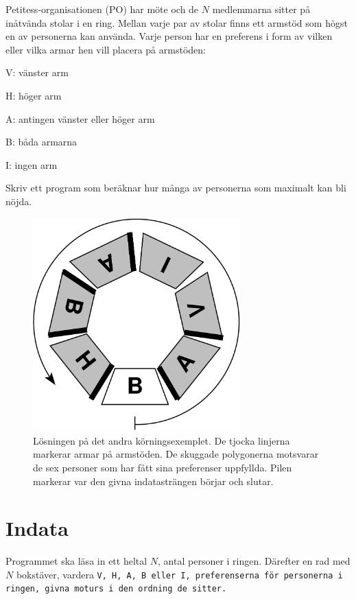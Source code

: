 
Petitess-organisationen (PO) har möte och de $N$ medlemmarna sitter på inåtvända stolar i en ring. Mellan varje par av stolar finns ett armstöd som högst en av personerna kan använda. Varje person har en preferens i form av vilken eller vilka armar hen vill placera på armstöden:
\begin{list}
\item V: vänster arm
\item H: höger arm
\item A: antingen vänster eller höger arm
\item B: båda armarna
\item I: ingen arm
\end{list}

Skriv ett program som beräknar hur många av personerna som maximalt kan bli nöjda.

\begin{figure}[h] 
\begin{center}
\includegraphics[width=8cm]{armstodbild.pdf}
\caption{Lösningen på det andra körningsexemplet. De tjocka linjerna markerar armar på armstöden. De skuggade polygonerna motsvarar de sex personer som har fått sina preferenser uppfyllda. Pilen markerar var den givna indatasträngen börjar och slutar.}
\end{center} 
\end{figure}

\section*{Indata}
Programmet ska läsa in ett heltal $N$, antal personer i ringen. Därefter en rad med $N$ bokstäver, vardera \tt{V}, \tt{H}, \tt{A}, \tt{B} eller \tt{I}, preferenserna för personerna i ringen, givna moturs i den ordning de sitter.

